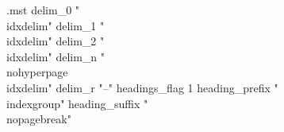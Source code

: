 %

\begin{filecontents*}{\jobname.mst}
delim_0 "\\idxdelim"
delim_1 "\\idxdelim"
delim_2 "\\idxdelim"
delim_n "\\nohyperpage{\\idxdelim}"
delim_r "--"
headings_flag 1
heading_prefix "\\indexgroup{{"
heading_suffix "}}\\nopagebreak\n"
\end{filecontents*}

\documentclass[cfonts]{nostarch}


\usepackage{amsmath, amsthm, amssymb}
\usepackage{exercise}
\usepackage{fancyhdr}
\usepackage{graphicx}
\usepackage{makeidx}
\usepackage{textcomp}
\usepackage{upquote}
\usepackage{url}
\usepackage{subfiles}
\usepackage[italic]{mathastext}
\usepackage{enumitem}

\usepackage{minitoc}
\setcounter{minitocdepth}{3}
\setcounter{parttocdepth}{3}

\newcommand{\myreg}{\textsuperscript{{\tiny \textregistered}}}

\newcommand{\console}[1]{>{}> \textbf{#1}}

\newenvironment{ex}{\begin{Exercise}}{\end{Exercise}}

\usepackage{bm}
\renewcommand{\vec}[1]{\bm{\mathbf{#1}}}
\newcommand{\uveci}{{\bm{\hat{\textnormal{\bfseries\i}}}}}
\newcommand{\uvecj}{{\bm{\hat{\textnormal{\bfseries\j}}}}}
\DeclareRobustCommand{\uvec}[1]{{%
  \ifcsname uvec#1\endcsname
     \csname uvec#1\endcsname
   \else
    \bm{\hat{\mathbf{#1}}}%
   \fi
}}

\renewcommand{\descriptionlabel}[1]{\hspace{\labelsep}\textbf{#1\quad}} %
\setcounter{secnumdepth}{0}


